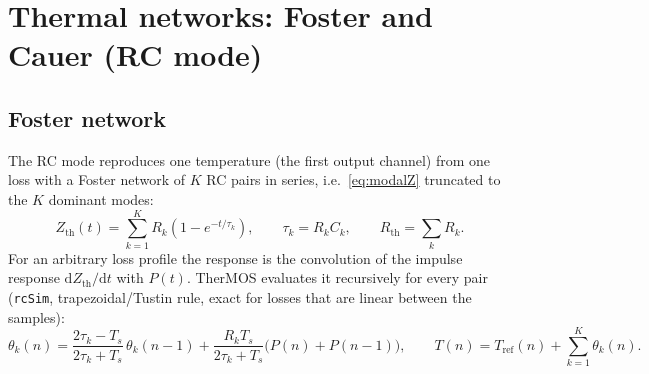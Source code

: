 \documentclass[11pt,a4paper]{article}
\newcommand{\Rth}{R_{\mathrm{th}}}
\newcommand{\Zth}{Z_{\mathrm{th}}}
\newcommand{\Tref}{T_{\mathrm{ref}}}
\begin{document}
\section{Thermal networks: Foster and Cauer (RC mode)}\label{sec:lumped}
\subsection{Foster network}
The RC mode reproduces one temperature (the first output channel) from one loss with a Foster network of $K$ RC pairs
in series, i.e.\ \eqref{eq:modalZ} truncated to the $K$ dominant modes:
\begin{equation}
  \Zth(t) = \sum_{k=1}^{K} R_k\left(1-e^{-t/\tau_k}\right),\qquad \tau_k = R_kC_k,\qquad
  \Rth = \sum_k R_k .
  \label{eq:foster}
\end{equation}
For an arbitrary loss profile the response is the convolution of the impulse response $\mathrm d\Zth/\mathrm dt$ with
$P(t)$. TherMOS evaluates it recursively for every pair (\texttt{rcSim}, trapezoidal/Tustin rule, exact for losses
that are linear between the samples):
\begin{equation}
  \theta_k(n) = \frac{2\tau_k - T_s}{2\tau_k+T_s}\,\theta_k(n-1) + \frac{R_kT_s}{2\tau_k+T_s}\bigl(P(n)+P(n-1)\bigr),
  \qquad T(n) = \Tref(n) + \sum_{k=1}^{K}\theta_k(n).
  \label{eq:tustin}
\end{equation}
\end{document}
